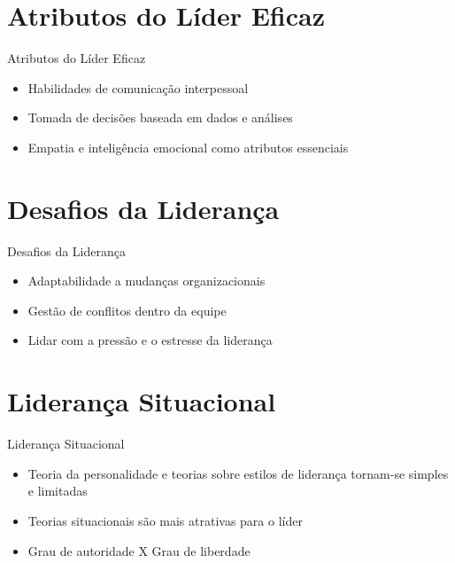\documentclass[aspectratio=169,xcolor=dvipsnames]{beamer}
\begin{document}
\section{Atributos do Líder Eficaz}

\begin{frame}{Atributos do Líder Eficaz}
	\begin{itemize}
		\item Habilidades de comunicação interpessoal
		\item Tomada de decisões baseada em dados e análises
		\item Empatia e inteligência emocional como atributos essenciais

	\end{itemize}
\end{frame}

\section{Desafios da Liderança}

\begin{frame}{Desafios da Liderança}
	\begin{itemize}
		\item Adaptabilidade a mudanças organizacionais
		\item Gestão de conflitos dentro da equipe
		\item Lidar com a pressão e o estresse da liderança

	\end{itemize}
\end{frame}

\section{Liderança Situacional}

\begin{frame}{Liderança Situacional}
	\begin{itemize}
		\item Teoria da personalidade e teorias sobre estilos de liderança tornam-se simples e limitadas
		\item Teorias situacionais são mais atrativas para o líder
		\item Grau de autoridade X Grau de liberdade
	\end{itemize}
\end{frame}
\end{document}
